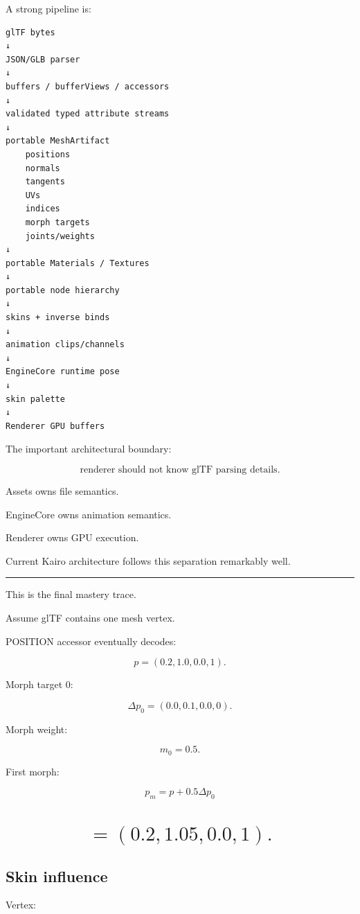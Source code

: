 A strong pipeline is:

\begin{verbatim}
glTF bytes
↓
JSON/GLB parser
↓
buffers / bufferViews / accessors
↓
validated typed attribute streams
↓
portable MeshArtifact
    positions
    normals
    tangents
    UVs
    indices
    morph targets
    joints/weights
↓
portable Materials / Textures
↓
portable node hierarchy
↓
skins + inverse binds
↓
animation clips/channels
↓
EngineCore runtime pose
↓
skin palette
↓
Renderer GPU buffers
\end{verbatim}

The important architectural boundary:

\[
\boxed{
\text{renderer should not know glTF parsing details}.
}
\]

Assets owns file semantics.

EngineCore owns animation semantics.

Renderer owns GPU execution.

Current Kairo architecture follows this separation remarkably well.

\begin{center}\rule{0.5\linewidth}{0.5pt}\end{center}

This is the final mastery trace.

Assume glTF contains one mesh vertex.

POSITION accessor eventually decodes:

\[
p=
(0.2,1.0,0.0,1).
\]

Morph target 0:

\[
\Delta p_0=
(0.0,0.1,0.0,0).
\]

Morph weight:

\[
m_0=0.5.
\]

First morph:

\[
p_m
=
p+
0.5\Delta p_0
\]

\section{\texorpdfstring{\[
=
(0.2,1.05,0.0,1).
\]}{
=
(0.2,1.05,0.0,1).
}}\label{04-visual-computing-ii-ch041-section}

\subsection{Skin influence}\label{04-visual-computing-ii-ch041-skin-influence}

Vertex:

